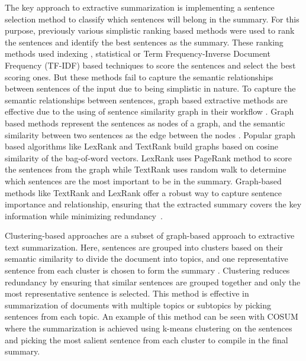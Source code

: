 \documentclass[acmlarge]{acmart}
\begin{document}
The key approach to extractive summarization is implementing a sentence selection method to classify which sentences will belong in the summary. For this purpose, previously various simplistic ranking based methods were used to rank the sentences and identify the best sentences as the summary. These ranking methods used indexing \cite{Baxendale_1958_firstsummarization}, statistical \cite{edmundson_1969_earlysum} or Term Frequency-Inverse Document Frequency (TF-IDF) \cite{das-2022-tfidf,sarkar-2012-tfidf-2,sarkar-2012-tfidf} based techniques to score the sentences and  select the best scoring ones. But these methods fail to capture the semantic relationships between sentences of the input due to being simplistic in nature. To capture the semantic relationships between sentences, graph based extractive methods are effective due to the using of sentence similarity graph in their workflow \cite{wafaa-2021-summary-comprehensive-review}. Graph based methods represent the sentences as nodes of a graph, and the semantic similarity between two sentences as the edge between the nodes \cite{moratanch-2017-extractive-review}. Popular graph based algorithms like LexRank \cite{Erkan-lexRank-2004} and TextRank \cite{mihalcea-2004-textrank} build graphs based on cosine similarity of the bag-of-word vectors. LexRank uses PageRank \cite{page-PageRank-1999} method to score the sentences from the graph while TextRank uses random walk to determine which sentences are the most important to be in the summary. Graph-based methods like TextRank and LexRank offer a robust way to capture sentence importance and relationship, ensuring that the extracted summary covers the key information while minimizing redundancy~\cite{wafaa-2021-summary-comprehensive-review}.

Clustering-based approaches are a subset of graph-based approach to extractive text summarization. Here, sentences are grouped into clusters based on their semantic similarity to divide the document into topics, and one representative sentence from each cluster is chosen to form the summary \cite{Mohan-2022-topic-modeling-rev-clustering}. Clustering reduces redundancy by ensuring that similar sentences are grouped together and only the most representative sentence is selected. This method is effective in summarization of documents with multiple topics or subtopics by picking sentences from each topic. An example of this method can be seen with COSUM \cite{alguliyev-2019-cosum} where the summarization is achieved using k-means clustering on the sentences and picking the most salient sentence from each cluster to compile in the final summary.
\end{document}
